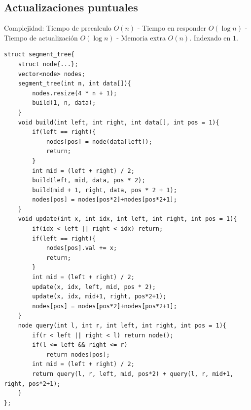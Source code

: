 \documentclass[12 pts,spanish,mexico]{article}
\numberwithin{equation}{section}
\begin{document}
\begin{multicols}{2}
\subsection{Actualizaciones puntuales}
Complejidad: Tiempo de precalculo $O(n)$ - Tiempo en responder $O(\log n)$ - Tiempo de actualización $O(\log n)$ - Memoria extra $O(n)$. Indexado en $1$.
\begin{verbatim}
struct segment_tree{
    struct node{...};
    vector<node> nodes;
    segment_tree(int n, int data[]){
        nodes.resize(4 * n + 1);
        build(1, n, data);
    }
    void build(int left, int right, int data[], int pos = 1){
        if(left == right){
            nodes[pos] = node(data[left]);
            return;
        }
        int mid = (left + right) / 2;
        build(left, mid, data, pos * 2);
        build(mid + 1, right, data, pos * 2 + 1);
        nodes[pos] = nodes[pos*2]+nodes[pos*2+1];
    }
    void update(int x, int idx, int left, int right, int pos = 1){
        if(idx < left || right < idx) return;
        if(left == right){
            nodes[pos].val += x;
            return;
        }
        int mid = (left + right) / 2;
        update(x, idx, left, mid, pos * 2);
        update(x, idx, mid+1, right, pos*2+1);
        nodes[pos] = nodes[pos*2]+nodes[pos*2+1];
    }
    node query(int l, int r, int left, int right, int pos = 1){
        if(r < left || right < l) return node();
        if(l <= left && right <= r)
            return nodes[pos];
        int mid = (left + right) / 2;
        return query(l, r, left, mid, pos*2) + query(l, r, mid+1, right, pos*2+1);
    }
};
\end{verbatim}


\end{multicols}
\end{document}
